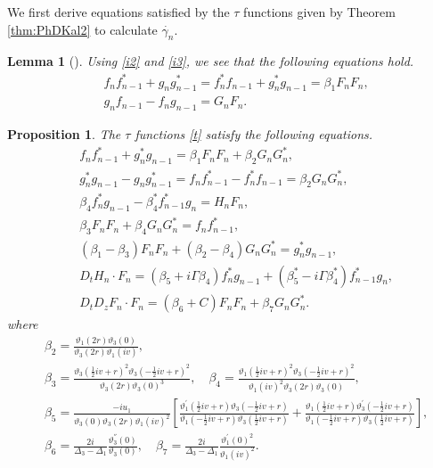 \documentclass[10pt,leqno]{amsart}
\newtheorem{lem}[theorem]{Lemma}
\newtheorem{prop}[theorem]{Proposition}
\numberwithin{equation}{section}
\begin{document}
We first derive equations satisfied by the $\tau$ functions given by Theorem \ref{thm:PhDKal2}
to calculate $\dot{\gamma_n}$.
\begin{lem}[{\cite[\S 3]{HIKMO:DLIE}}]\label{prop:bilinears1} 
Using \eqref{i2} and \eqref{i3}, we see that the following equations hold.
\begin{align}
&f_{n}f_{n-1}^*+g_{n}g_{n-1}^*=f_{n}^*f_{n-1}+g_{n}^*g_{n-1}=\beta_{1} F_{n}F_{n}, \label{2i1}\\
&g_{n}f_{n-1}-f_{n}g_{n-1}=G_{n}F_{n}. \label{2i2}
\end{align}
\end{lem}
\begin{prop}\label{prop:PhDKalbi1}
The $\tau$ functions \eqref{t} satisfy the following equations.
\begin{align}
&f_{n}f_{n-1}^*+g_{n}^{*}g_{n-1}=\beta_{1} F_{n}F_{n}+\beta_{2} G_{n}G_{n}^*,\label{57}\\
&g_{n}^{*}g_{n-1}-g_{n}g_{n-1}^*=f_{n}f_{n-1}^{*}-f_{n}^*f_{n-1}=\beta_{2} G_{n}G_{n}^*,\label{58}\\
&\beta_{4} f_{n}^{*}g_{n-1}-\beta_{4}^{*}f_{n-1}^{*}g_{n}=H_{n}F_{n},\label{59}\\
&\beta_{3} F_{n}F_{n}+\beta_{4}G_{n}G_{n}^{*}=f_{n}f_{n-1}^{*},\label{60}\\
&\left(\beta_{1}-\beta_{3}\right) F_{n}F_{n}+\left(\beta_{2}-\beta_{4}\right)G_{n}G_{n}^{*}=g_{n}^{*}g_{n-1},\label{61}\\
&D_{t}H_{n}\cdot F_{n}=\left(\beta_{5}+i\Gamma\beta_{4}\right) f_{n}^{*}g_{n-1}+\left(\beta_{5}^{*}-i\Gamma\beta_{4}^{*}\right) f_{n-1}^{*}g_{n},\label{62}\\
&D_{t}D_{z}F_{n}\cdot F_{n}=\left(\beta_{6}+C\right)F_{n}F_{n}+\beta_{7}G_{n}G_{n}^{*}.\label{63}
\end{align}
where
\begin{align}\label{50-1}
&\beta_{2}=\frac{\vartheta_{1}\left(2r\right)\vartheta_{3}\left(0\right)}{\vartheta_{3}\left(2r\right)\vartheta_{1}\left(iv\right)},\\
&\beta_{3}=\frac{\vartheta_{3}\left(\frac{1}{2}iv+r\right)^{2}\vartheta_{3}\left(-\frac{1}{2}iv+r\right)^{2}}{\vartheta_{3}\left(2r\right)\vartheta_{3}\left(0\right)^{3}},\quad\beta_{4}=\frac{\vartheta_{1}\left(\frac{1}{2}iv+r\right)^{2}\vartheta_{3}\left(-\frac{1}{2}iv+r\right)^{2}}{\vartheta_{1}\left(iv\right)^{2}\vartheta_{3}\left(2r\right)\vartheta_{3}\left(0\right)},\nonumber\\
&\beta_{5}=\frac{-iu_{1}}{\vartheta_{3}(0)\vartheta_{3}(2r)\vartheta_{1}(iv)^2}\left[\frac{\vartheta_{1}^{'}\left(\frac{1}{2}iv+r\right)\vartheta_{3}\left(-\frac{1}{2}iv+r\right)}{\vartheta_{1}\left(-\frac{1}{2}iv+r\right)\vartheta_{3}\left(\frac{1}{2}iv+r\right)}
+\frac{\vartheta_{1}\left(\frac{1}{2}iv+r\right)\vartheta_{3}^{'}\left(-\frac{1}{2}iv+r\right)}{\vartheta_{1}\left(-\frac{1}{2}iv+r\right)\vartheta_{3}\left(\frac{1}{2}iv+r\right)}\right],\nonumber\\
&\beta_{6}=\frac{2i}{\Delta_{3}-\Delta_{1}}\frac{\vartheta_{3}^{''}(0)}{\vartheta_{3}(0)},\quad\beta_{7}=\frac{2i}{\Delta_{3}-\Delta_{1}}\frac{\vartheta_{1}^{'}(0)^{2}}{\vartheta_{1}(iv)^{2}}.\nonumber
\end{align}
\end{prop}
\end{document}
